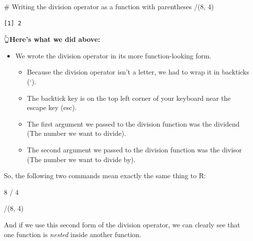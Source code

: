 \documentclass[
  letterpaper,
  DIV=11,
  numbers=noendperiod]{scrreprt}
\newenvironment{Shaded}{\begin{snugshade}}{\end{snugshade}}
\newcommand{\AttributeTok}[1]{\textcolor[rgb]{0.40,0.45,0.13}{#1}}
\newcommand{\CommentTok}[1]{\textcolor[rgb]{0.37,0.37,0.37}{#1}}
\newcommand{\DecValTok}[1]{\textcolor[rgb]{0.68,0.00,0.00}{#1}}
\newcommand{\NormalTok}[1]{\textcolor[rgb]{0.00,0.23,0.31}{#1}}
\newcommand{\SpecialCharTok}[1]{\textcolor[rgb]{0.37,0.37,0.37}{#1}}
\newcommand{\StringTok}[1]{\textcolor[rgb]{0.13,0.47,0.30}{#1}}
\begin{document}
\begin{Shaded}
\begin{Highlighting}[]
\CommentTok{\# Writing the division operator as a function with parentheses}
\StringTok{\textasciigrave{}}\AttributeTok{/}\StringTok{\textasciigrave{}}\NormalTok{(}\DecValTok{8}\NormalTok{, }\DecValTok{4}\NormalTok{)}
\end{Highlighting}
\end{Shaded}

\begin{verbatim}
[1] 2
\end{verbatim}

👆\textbf{Here's what we did above:}

\begin{itemize}
\item
  We wrote the division operator in its more function-looking form.

  \begin{itemize}
  \item
    Because the division operator isn't a letter, we had to wrap it in
    backticks (`).
  \item
    The backtick key is on the top left corner of your keyboard near the
    escape key (esc).
  \item
    The first argument we passed to the division function was the
    dividend (The number we want to divide).
  \item
    The second argument we passed to the division function was the
    divisor (The number we want to divide by).
  \end{itemize}
\end{itemize}

So, the following two commands mean exactly the same thing to R:

\begin{Shaded}
\begin{Highlighting}[]
\DecValTok{8} \SpecialCharTok{/} \DecValTok{4}
\end{Highlighting}
\end{Shaded}

\begin{Shaded}
\begin{Highlighting}[]
\StringTok{\textasciigrave{}}\AttributeTok{/}\StringTok{\textasciigrave{}}\NormalTok{(}\DecValTok{8}\NormalTok{, }\DecValTok{4}\NormalTok{)}
\end{Highlighting}
\end{Shaded}

And if we use this second form of the division operator, we can clearly
see that one function is \emph{nested} inside another function.
\end{document}
